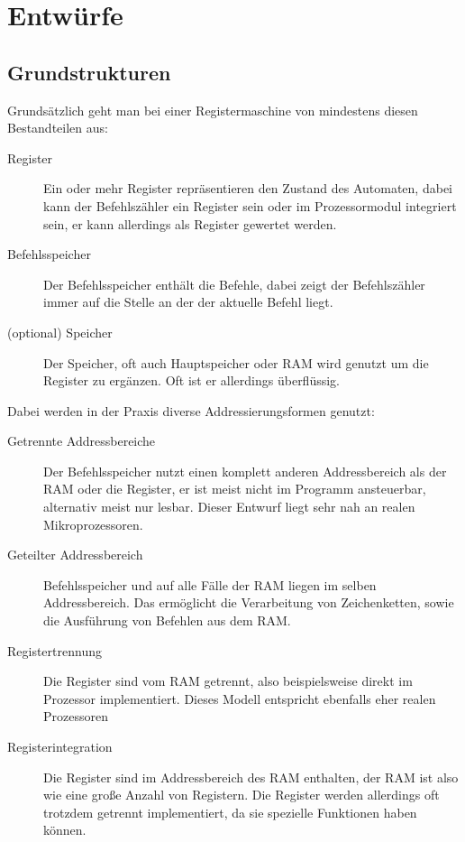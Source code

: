 \documentclass[a4paper,12pt,oneside]{scrreprt}
\begin{document}
\chapter{Entwürfe}

\section{Grundstrukturen}

Grundsätzlich geht man bei einer Registermaschine von mindestens diesen Bestandteilen aus:

\begin{description}

\item[Register] Ein oder mehr Register repräsentieren den Zustand des Automaten, dabei kann der Befehlszähler ein Register sein oder im Prozessormodul integriert sein, er kann allerdings als Register gewertet werden.

\item[Befehlsspeicher] Der Befehlsspeicher enthält die Befehle, dabei zeigt der Befehlszähler immer auf die Stelle an der der aktuelle Befehl liegt.

\item[(optional) Speicher] Der Speicher, oft auch Hauptspeicher oder RAM wird genutzt um die Register zu ergänzen. Oft ist er allerdings überflüssig. 
\end{description}

Dabei werden in der Praxis diverse Addressierungsformen genutzt:

\begin{description}

\item[Getrennte Addressbereiche] Der Befehlsspeicher nutzt einen komplett anderen Addressbereich als der RAM oder die Register, er ist meist nicht im Programm ansteuerbar, alternativ meist nur lesbar. Dieser Entwurf liegt sehr nah an realen Mikroprozessoren.

\item[Geteilter Addressbereich] Befehlsspeicher und auf alle Fälle der RAM liegen im selben Addressbereich. Das ermöglicht die Verarbeitung von Zeichenketten, sowie die Ausführung von Befehlen aus dem RAM.

\item[Registertrennung] Die Register sind vom RAM getrennt, also beispielsweise direkt im Prozessor implementiert. Dieses Modell entspricht ebenfalls eher realen Prozessoren

\item[Registerintegration] Die Register sind im Addressbereich des RAM enthalten, der RAM ist also wie eine große Anzahl von Registern. Die Register werden allerdings oft trotzdem getrennt implementiert, da sie spezielle Funktionen haben können.

\end{description}
\end{document}
